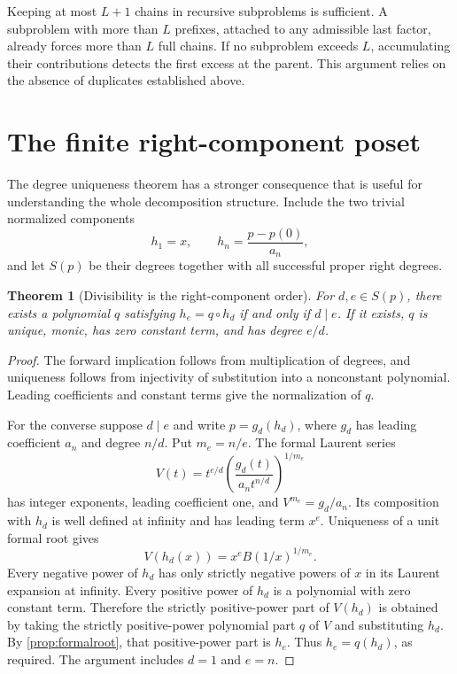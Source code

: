 \documentclass[11pt,a4paper]{article}
\newtheorem{theorem}{Theorem}[section]
\theoremstyle{definition}
\begin{document}
Keeping at most $L+1$ chains in recursive subproblems is sufficient. A subproblem with more than $L$ prefixes, attached to any admissible last factor, already forces more than $L$ full chains. If no subproblem exceeds $L$, accumulating their contributions detects the first excess at the parent. This argument relies on the absence of duplicates established above.

\section{The finite right-component poset}\label{sec:poset}
The degree uniqueness theorem has a stronger consequence that is useful for understanding the whole decomposition structure. Include the two trivial normalized components
\[
 h_1=x,\qquad h_n=\frac{p-p(0)}{a_n},
\]
and let $S(p)$ be their degrees together with all successful proper right degrees.

\begin{theorem}[Divisibility is the right-component order]\label{thm:poset}
For $d,e\in S(p)$, there exists a polynomial $q$ satisfying $h_e=q\circ h_d$ if and only if $d\mid e$. If it exists, $q$ is unique, monic, has zero constant term, and has degree $e/d$.
\end{theorem}
\begin{proof}
The forward implication follows from multiplication of degrees, and uniqueness follows from injectivity of substitution into a nonconstant polynomial. Leading coefficients and constant terms give the normalization of $q$.

For the converse suppose $d\mid e$ and write $p=g_d(h_d)$, where $g_d$ has leading coefficient $a_n$ and degree $n/d$. Put $m_e=n/e$. The formal Laurent series
\[
 V(t)=t^{e/d}\left(\frac{g_d(t)}{a_n t^{n/d}}\right)^{1/m_e}
\]
has integer exponents, leading coefficient one, and $V^{m_e}=g_d/a_n$. Its composition with $h_d$ is well defined at infinity and has leading term $x^e$. Uniqueness of a unit formal root gives
\[
 V(h_d(x))=x^e B(1/x)^{1/m_e}.
\]
Every negative power of $h_d$ has only strictly negative powers of $x$ in its Laurent expansion at infinity. Every positive power of $h_d$ is a polynomial with zero constant term. Therefore the strictly positive-power part of $V(h_d)$ is obtained by taking the strictly positive-power polynomial part $q$ of $V$ and substituting $h_d$. By \cref{prop:formalroot}, that positive-power part is $h_e$. Thus $h_e=q(h_d)$, as required. The argument includes $d=1$ and $e=n$.
\end{proof}
\end{document}
